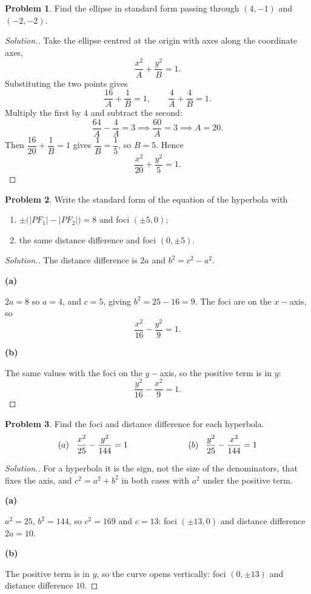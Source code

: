 \documentclass[11pt,a4paper]{article}
\theoremstyle{definition}
\newtheorem{problemx}{Problem}[subsection]
\newenvironment{problem}{\begin{problemx}}{\end{problemx}}
\newenvironment{solution}
  {\renewcommand{\qedsymbol}{}\begin{proof}[\textit{Solution}.]}
  {\end{proof}}
\newcommand{\subhead}[1]{%
  \par\medskip\noindent\textbf{#1}\par\nobreak\smallskip}
\begin{document}
\begin{problem}
Find the ellipse in standard form passing through $(4,-1)$ and $(-2,-2)$.
\end{problem}
\begin{solution}
Take the ellipse centred at the origin with axes along the coordinate axes,
$$\frac{x^2}{A} + \frac{y^2}{B} = 1 .$$
Substituting the two points gives
$$\frac{16}{A} + \frac{1}{B} = 1, \qquad \frac{4}{A} + \frac{4}{B} = 1 .$$
Multiply the first by $4$ and subtract the second:
$$\frac{64}{A} - \frac{4}{A} = 3 \implies \frac{60}{A} = 3 \implies A = 20 .$$
Then $\dfrac{16}{20} + \dfrac{1}{B} = 1$ gives $\dfrac{1}{B} = \dfrac{1}{5}$, so
$B = 5$. Hence
$$\frac{x^2}{20} + \frac{y^2}{5} = 1 .$$
\end{solution}

\begin{problem}
Write the standard form of the equation of the hyperbola with
\begin{enumerate}
\item[(a)] $\pm\big(\left|PF_1\right| - \left|PF_2\right|\big) = 8$ and foci
$(\pm 5, 0)$;
\item[(b)] the same distance difference and foci $(0, \pm 5)$.
\end{enumerate}
\end{problem}
\begin{solution}
The distance difference is $2a$ and $b^2 = c^2 - a^2$.

\subhead{(a)}
$2a = 8$ so $a = 4$, and $c = 5$, giving $b^2 = 25 - 16 = 9$. The foci are on the
$x-$axis, so
$$\frac{x^2}{16} - \frac{y^2}{9} = 1 .$$

\subhead{(b)}
The same values with the foci on the $y-$axis, so the positive term is in $y$:
$$\frac{y^2}{16} - \frac{x^2}{9} = 1 .$$
\end{solution}

\begin{problem}
Find the foci and distance difference for each hyperbola.
$$(a)\hspace{0.3cm}\frac{x^2}{25} - \frac{y^2}{144} = 1
\hspace{2.5cm} (b)\hspace{0.3cm}\frac{y^2}{25} - \frac{x^2}{144} = 1$$
\end{problem}
\begin{solution}
For a hyperbola it is the sign, not the size of the denominators, that fixes the
axis, and $c^2 = a^2 + b^2$ in both cases with $a^2$ under the positive term.

\subhead{(a)}
$a^2 = 25$, $b^2 = 144$, so $c^2 = 169$ and $c = 13$: foci $(\pm 13, 0)$ and
distance difference $2a = 10$.

\subhead{(b)}
The positive term is in $y$, so the curve opens vertically: foci $(0, \pm 13)$
and distance difference $10$.
\end{solution}
\end{document}
